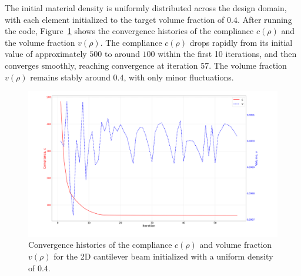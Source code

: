 \documentclass[mathpazo]{cicp}
\begin{document}
The initial material density is uniformly distributed across the design domain, with each element initialized to the target volume fraction of $0.4$. After running the code, Figure~\ref{fig:canti_04_convergence} shows the convergence histories of the compliance $c(\rho)$ and the volume fraction $v(\rho)$. The compliance $c(\rho)$ drops rapidly from its initial value of approximately $500$ to around $100$ within the first 10 iterations, and then converges smoothly, reaching convergence at iteration 57. The volume fraction $v(\rho)$ remains stably around $0.4$, with only minor fluctuations.
\begin{figure}[htp]
	\centering
	\includegraphics[width=1.0\textwidth]{figures/cantilever_2d_04_convergence.png}
	\caption{Convergence histories of the compliance $c(\rho)$ and volume fraction $v(\rho)$ for the 2D cantilever beam initialized with a uniform density of $0.4$.}
	\label{fig:canti_04_convergence}
\end{figure}
\end{document}
